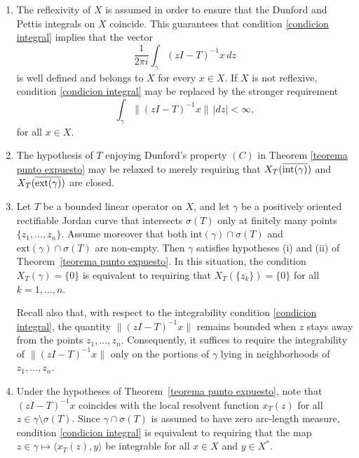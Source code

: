 \documentclass[11pt]{amsart}
\theoremstyle{definition}
\theoremstyle{remark}
\numberwithin{equation}{section}
\newcommand{\pe}[1]{\langle#1\rangle}
\newcommand{\Xint}{X_T(\overline{\inte(\gamma)})}
\newcommand{\Xext}{X_T(\overline{\exte(\gamma)})}
\newcommand{\inte}{\textnormal{int}}
\newcommand{\exte}{\textnormal{ext}}
\begin{document}
\begin{enumerate}
\item The reflexivity of $X$ is assumed in order to ensure that the Dunford and Pettis integrals on $X$ coincide. This guarantees that condition \eqref{condicion integral} implies that the vector
$$
\frac{1}{2\pi i}\int_\gamma (z I-T)^{-1}x\,dz
$$
is well defined and belongs to $X$ for every $x\in X$. If $X$ is not reflexive, condition \eqref{condicion integral} may be replaced by the stronger requirement
\begin{equation}\label{non-reflexive}
\int_\gamma \|(z I-T)^{-1}x\|\,|dz|<\infty,
\end{equation}
for all $x\in X$.

\item The hypothesis of $T$ enjoying Dunford's property $(C)$ in Theorem \ref{teorema punto expuesto} may be relaxed to merely requiring that $\Xint$ and $\Xext$ are closed.

\item Let $T$ be a bounded linear operator on $X$, and let $\gamma$ be a positively oriented rectifiable Jordan curve that intersects $\sigma(T)$ only at finitely many points $\{z_1,\ldots,z_n\}$. Assume moreover that both $\mathrm{int}(\gamma)\cap\sigma(T)$ and $\mathrm{ext}(\gamma)\cap\sigma(T)$ are non-empty. Then $\gamma$ satisfies hypotheses (i) and (ii) of Theorem~\ref{teorema punto expuesto}. In this situation, the condition $X_T(\gamma)=\{0\}$ is equivalent to requiring that $X_T(\{z_k\})=\{0\}$ for all $k=1,\ldots,n$.

Recall also that, with respect to the integrability condition \eqref{condicion integral}, the quantity $\|(z I-T)^{-1}x\|$ remains bounded when $z$ stays away from the points $z_1,\ldots,z_n$. Consequently, it suffices to require the integrability of $\|(z I-T)^{-1}x\|$ only on the portions of $\gamma$ lying in neighborhoods of $z_1,\ldots,z_n$.

\item Under the hypotheses of Theorem~\ref{teorema punto expuesto}, note that $(z I-T)^{-1}x$ coincides with the local resolvent function $x_T(z)$ for all $z\in\gamma\setminus\sigma(T)$. Since $\gamma\cap\sigma(T)$ is assumed to have zero arc-length measure, condition \eqref{condicion integral} is equivalent to requiring that the map $z\in\gamma\mapsto \pe{x_T(z),y}$ be integrable for all $x\in X$ and $y\in X^*$.
\end{enumerate}

\medskip
\end{document}
